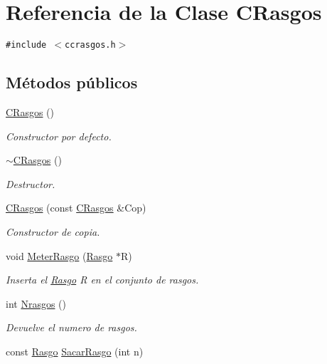\hypertarget{class_c_rasgos}{
\section{Referencia de la Clase CRasgos}
\label{class_c_rasgos}
}
{\tt \#include $<$ccrasgos.h$>$}

\subsection*{Métodos públicos}
\begin{CompactItemize}
\item 
\hyperlink{class_c_rasgos_f4ddb3b5ae04a6c3cc7696f01c508823}{CRasgos} ()
\begin{CompactList}\small\item\em Constructor por defecto. \item\end{CompactList}\item 
\hyperlink{class_c_rasgos_acd1dea2f1da5efa4f7b066712913940}{$\sim$CRasgos} ()
\begin{CompactList}\small\item\em Destructor. \item\end{CompactList}\item 
\hyperlink{class_c_rasgos_2d9e8f84bc7339fc3ffe38cb770910ea}{CRasgos} (const \hyperlink{class_c_rasgos}{CRasgos} \&Cop)
\begin{CompactList}\small\item\em Constructor de copia. \item\end{CompactList}\item 
void \hyperlink{class_c_rasgos_3af493672124ac9d4b94271c9004bda2}{MeterRasgo} (\hyperlink{class_rasgo}{Rasgo} $\ast$R)
\begin{CompactList}\small\item\em Inserta el \hyperlink{class_rasgo}{Rasgo} R en el conjunto de rasgos. \item\end{CompactList}\item 
int \hyperlink{class_c_rasgos_80199d2461b16fbba188ad696105257d}{Nrasgos} ()
\begin{CompactList}\small\item\em Devuelve el numero de rasgos. \item\end{CompactList}\item 
const \hyperlink{class_rasgo}{Rasgo} \hyperlink{class_c_rasgos_4ecb8e73d826f5d236e3caa2f86e954d}{SacarRasgo} (int n)

\end{CompactItemize}
